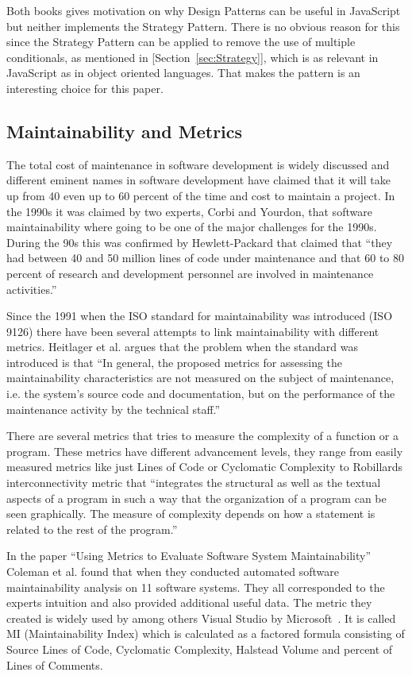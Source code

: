 \documentclass[conference, a4paper]{IEEEtran}
\begin{document}
Both books gives motivation on why Design Patterns can be useful in JavaScript but neither implements the Strategy Pattern. There is no obvious reason for this since the Strategy Pattern can be applied to remove the use of multiple conditionals, as mentioned in [Section~\ref{sec:Strategy}], which is as relevant in JavaScript as in object oriented languages. That makes the pattern is an interesting choice for this paper.

\subsection{Maintainability and Metrics}
\label{sec:Maintainability}
The total cost of maintenance in software development is widely discussed and different eminent names in software development have claimed that it will take up from 40 even up to 60 percent of the time and cost to maintain a project. In the 1990s it was claimed by two experts, Corbi and Yourdon, that software maintainability where going to be one of the major challenges for the 1990s. During the 90s this was confirmed by Hewlett-Packard that claimed that ``they had between 40 and 50 million lines of code under maintenance and that 60 to 80 percent of research and development personnel are involved in maintenance activities.''~\cite{bibitem:MetricsToEvaluate}

Since the 1991 when the ISO standard for maintainability was introduced (ISO 9126) there have been several attempts to link maintainability with different metrics. Heitlager et al. argues that the problem when the standard was introduced is that ``In general, the proposed metrics for assessing the maintainability characteristics are not measured on the subject of maintenance, i.e. the system’s source code and documentation, but on the performance of the maintenance activity by the technical staff.''~\cite{bibitem:Maintainability}

There are several metrics that tries to measure the complexity of a function or a program. These metrics have different advancement levels, they range from easily measured metrics like just Lines of Code or Cyclomatic Complexity to Robillards interconnectivity metric that ``integrates the structural as well as the textual aspects of a program in such a way that the organization of a program can be seen graphically. The measure of complexity depends on how a statement is related to the rest of the program.''~\cite{bibitem:Robillard}

In the paper ``Using Metrics to Evaluate Software System Maintainability'' Coleman et al. found that when they conducted automated software maintainability analysis on 11 software systems. They all corresponded to the experts intuition and also provided additional useful data. The metric they created is widely used by among others Visual Studio by Microsoft~\cite{bibitem:MI}. It is called MI (Maintainability Index) which is calculated as a factored formula consisting of Source Lines of Code, Cyclomatic Complexity, Halstead Volume and percent of Lines of Comments.~\cite{bibitem:MetricsToEvaluate}
\end{document}
